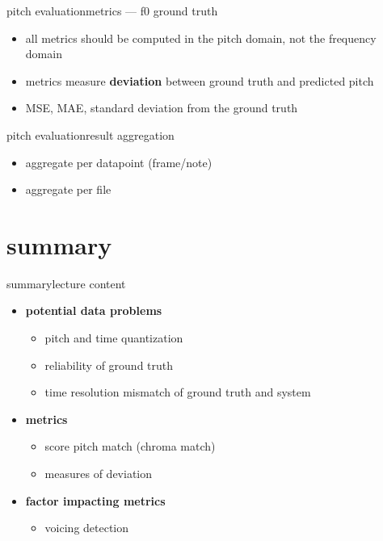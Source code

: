        \begin{frame}{pitch evaluation}{metrics --- f0 ground truth}
            \begin{itemize}
                \item   all metrics should be computed in the pitch domain, not the frequency domain
                \item   metrics measure \textbf{deviation} between ground truth and predicted pitch 
                \bigskip
                \item<2->   MSE, MAE, standard deviation from the ground truth
            \end{itemize}
       \end{frame}
       \begin{frame}{pitch evaluation}{result aggregation}
            \begin{itemize}
                \item   aggregate per datapoint (frame/note)
                \item   aggregate per file
            \end{itemize}
       \end{frame}
     

    \section{summary}
        \begin{frame}{summary}{lecture content}
            \begin{itemize}
                \item   \textbf{potential data problems}
                    \begin{itemize}
                        \item   pitch and time quantization
                        \item   reliability of ground truth
                        \item   time resolution mismatch of ground truth and system
                    \end{itemize}
                \bigskip
                \item  \textbf{metrics}
                    \begin{itemize}
                        \item   score pitch match (chroma match)
                        \item   measures of deviation
                    \end{itemize}
                \bigskip
                \item      \textbf{factor impacting metrics}
                    \begin{itemize}
                        \item   voicing detection
                    \end{itemize}
            \end{itemize}
        \end{frame}

